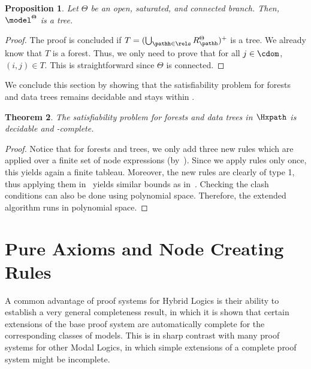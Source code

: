\documentclass[10pt,a4paper]{amsart}
\newtheorem{thm}{Theorem}[section]
\newtheorem{prop}[thm]{Proposition}
\theoremstyle{definition}
\theoremstyle{remark}
\begin{document}
\begin{prop}
    \label{prop:connectedtree}
    Let $\Theta$ be an open, saturated, and connected branch. Then, $\model^{\Theta}$ is a tree. 
\end{prop}

\begin{proof}
    The proof is concluded if $T = (\bigcup_{\pathh\in\rels} R_{\pathh}^{\Theta})^{+}$ is a tree.
    We already know that $T$ is a forest.
    Thus, we only need to prove that for all $j\in\cdom$, $(i,j)\in \mathbin{T}$.
    This is straightforward since $\Theta$ is connected.
\end{proof}

We conclude this section by showing that the satisfiability problem for forests and data trees remains decidable and stays within \pspace.


\begin{thm}
    \label{th:terminationtrees}
   The satisfiability problem for forests and data trees in $\Hxpath$ is decidable and \pspace-complete.
\end{thm}



\begin{proof}
    Notice that for forests and trees, we only add three new rules which are applied over
    a finite set of node expressions (by~). Since we apply rules only once, this yields again a finite tableau. Moreover, the new rules are clearly of type 1, thus applying them in~ yields similar bounds as in~. Checking the clash conditions can also be done using polynomial space. Therefore, the extended algorithm runs in polynomial space.
\end{proof}


\section{Pure Axioms and Node Creating Rules}
\label{sec:pure-ext}

A common advantage of proof systems for Hybrid Logics is their ability to establish a very general completeness result, in which it is shown that certain extensions of the base proof system are automatically complete for the corresponding classes of models.  This is in sharp contrast with many proof systems for other Modal Logics, in which simple extensions of a complete proof system might be incomplete.
\end{document}
